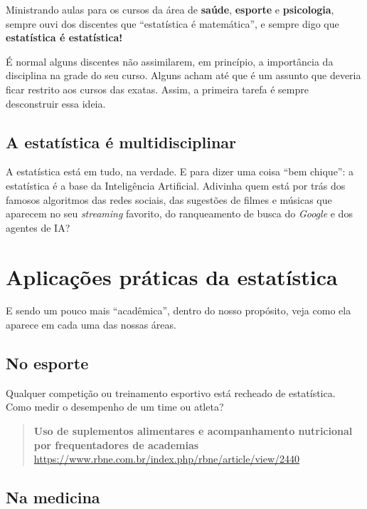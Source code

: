 \documentclass[
]{book}
\begin{document}
Ministrando aulas para os cursos da área de \textbf{saúde}, \textbf{esporte} e \textbf{psicologia}, sempre ouvi dos discentes que ``estatística é matemática'', e sempre digo que \textbf{estatística é estatística!}

É normal alguns discentes não assimilarem, em princípio, a importância da disciplina na grade do seu curso. Alguns acham até que é um assunto que deveria ficar restrito aos cursos das exatas. Assim, a primeira tarefa é sempre desconstruir essa ideia.

\subsection{A estatística é multidisciplinar}\label{a-estatuxedstica-uxe9-multidisciplinar}

A estatística está em tudo, na verdade. E para dizer uma coisa ``bem chique'': a estatística é a base da Inteligência Artificial. Adivinha quem está por trás dos famosos algoritmos das redes sociais, das sugestões de filmes e músicas que aparecem no seu \emph{streaming} favorito, do ranqueamento de busca do \emph{Google} e dos agentes de IA?

\section{Aplicações práticas da estatística}\label{aplicauxe7uxf5es-pruxe1ticas-da-estatuxedstica}

E sendo um pouco mais ``acadêmica'', dentro do nosso propósito, veja como ela aparece em cada uma das nossas áreas.

\subsection{No esporte}\label{no-esporte}

Qualquer competição ou treinamento esportivo está recheado de estatística. Como medir o desempenho de um time ou atleta?

\begin{quote}
\textbf{Uso de suplementos alimentares e acompanhamento nutricional por frequentadores de academias}\\
\url{https://www.rbne.com.br/index.php/rbne/article/view/2440}
\end{quote}

\subsection{Na medicina}\label{na-medicina}
\end{document}
